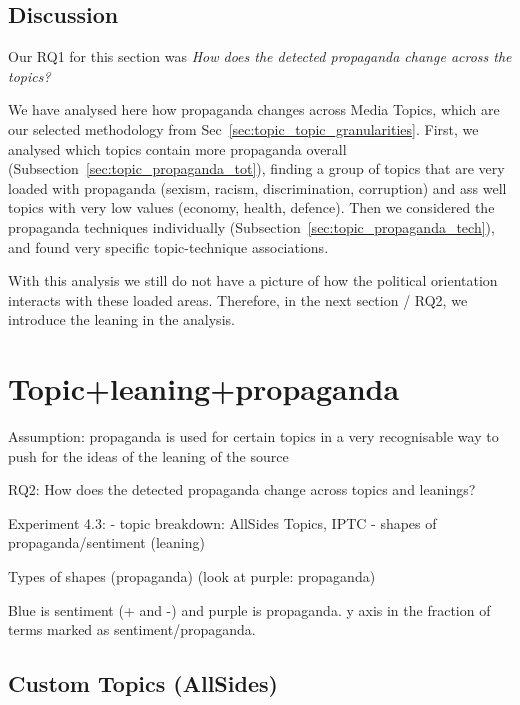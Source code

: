\subsection{Discussion}

Our RQ1 for this section was \emph{How does the detected propaganda change across the topics?}

We have analysed here how propaganda changes across Media Topics, which are our selected methodology from Sec~\ref{sec:topic_topic_granularities}.
First, we analysed which topics contain more propaganda overall (Subsection~\ref{sec:topic_propaganda_tot}), finding a group of topics that are very loaded with propaganda (sexism, racism, discrimination, corruption) and ass well topics with very low values (economy, health, defence).
Then we considered the propaganda techniques individually (Subsection~\ref{sec:topic_propaganda_tech}), and found very specific topic-technique associations.

With this analysis we still do not have a picture of how the political orientation interacts with these loaded areas. Therefore, in the next section / RQ2, we introduce the leaning in the analysis.



\section{\statusred Topic+leaning+propaganda}
\label{sec:topic_propaganda_leaning}

Assumption: propaganda is used for certain topics in a very recognisable way to push for the ideas of the leaning of the source

RQ2: How does the detected propaganda change across topics and leanings? 


Experiment 4.3: 
- topic breakdown: AllSides Topics, IPTC
- shapes of propaganda/sentiment (leaning)


Types of shapes (propaganda)
(look at purple: propaganda)

Blue is sentiment (+ and -) and purple is propaganda. 
y axis in the fraction of terms marked as sentiment/propaganda.

\subsection{Custom Topics (AllSides)}

